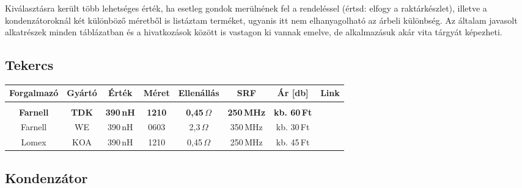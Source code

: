 Kiválasztásra került több lehetséges érték, ha esetleg gondok merülnének fel a rendeléssel (értsd: elfogy a raktárkészlet), illetve a kondenzátoroknál két különböző méretből is listáztam terméket, ugyanis itt nem elhanyagolható az árbeli különbség. Az általam javasolt alkatrészek minden táblázatban és a hivatkozások között is vastagon ki vannak emelve, de alkalmazásuk akár vita tárgyát képezheti.

\subsection*{Tekercs}

\begin{center}
	\begin{tabular}{ c c c c c c c c }
		\textbf{Forgalmazó} & \textbf{Gyártó} & \textbf{Érték} & \textbf{Méret} & \textbf{Ellenállás} & \textbf{SRF} & \textbf{Ár [db]} & \textbf{Link}\\
		
		\hline \\
		
		\textbf{Farnell} & \textbf{TDK} & \textbf{390\,nH} & \textbf{1210} & \textbf{0,45\,$\Omega$} & \textbf{250\,MHz} & \textbf{kb. 60\,Ft} & \textbf{\cite{tdk_tekercs}} \\[10pt]
		
		Farnell & WE & 390\,nH & 0603 & 2,3\,$\Omega$ & 350\,MHz & kb. 30\,Ft & \cite{we_tekercs} \\[10pt]
		
		Lomex & KOA & 390\,nH & 1210 & 0,45\,$\Omega$ & 250\,MHz & kb. 45\,Ft & \cite{koa_tekercs}
		
		
	 	\end{tabular}
\end{center}


\subsection*{Kondenzátor}

